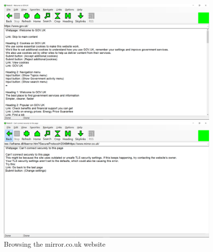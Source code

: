 \begin{figure}[tp]
    \begin{minipage}{0.48\linewidth}
        \centering
        \includegraphics[keepaspectratio,width=\linewidth]
        {images/webbie-gov}
        
        \caption[WebbIE browser]
        {%
        Browsing the gov.uk website
        }
        \label{fig:webbie-gov}
    \end{minipage}\hfill
    \begin{minipage}{0.48\linewidth}
        \centering
        \includegraphics[keepaspectratio,width=\linewidth]
        {images/webbie-mirror}
        
        \caption[WebbIE browser]
        {%
        Browsing the mirror.co.uk website
        }
        \label{fig:webbie-mirror}
    \end{minipage}
\end{figure}

